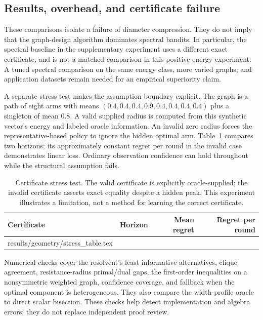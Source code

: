 \subsection{Results, overhead, and certificate failure}


These comparisons isolate a failure of diameter compression. They do not imply that the graph-design algorithm dominates spectral bandits. In particular, the spectral baseline in the supplementary experiment uses a different exact certificate, and is not a matched comparison in this positive-energy experiment. A tuned spectral comparison on the same energy class, more varied graphs, and application datasets remain needed for an empirical superiority claim.

A separate stress test makes the assumption boundary explicit. The graph is a path of eight arms with means $(0.4,0.4,0.4,0.9,0.4,0.4,0.4,0.4)$ plus a singleton of mean $0.8$. A valid supplied radius is computed from this synthetic vector's energy and labeled oracle information. An invalid zero radius forces the representative-based policy to ignore the hidden optimal arm. Table~\ref{tab:certificatestress} compares two horizons; its approximately constant regret per round in the invalid case demonstrates linear loss. Ordinary observation confidence can hold throughout while the structural assumption fails.

\begin{table}[t]
\centering\small
\begin{tabular}{lrrr}
\toprule
Certificate & Horizon & Mean regret & Regret per round\\
\midrule
{} results/geometry/stress_table.tex
\bottomrule
\end{tabular}
\caption{Certificate stress test. The valid certificate is explicitly oracle-supplied; the invalid certificate asserts exact equality despite a hidden peak. This experiment illustrates a limitation, not a method for learning the correct certificate.}
\label{tab:certificatestress}
\end{table}

Numerical checks cover the resolvent's least informative alternatives, clique agreement, resistance-radius primal/dual gaps, the first-order inequalities on a nonsymmetric weighted graph, confidence coverage, and fallback when the optimal component is heterogeneous. They also compare the width-profile oracle to direct scalar bisection. These checks help detect implementation and algebra errors; they do not replace independent proof review.
